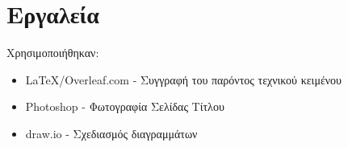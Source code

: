 \documentclass{article}
\begin{document}
\newpage

\section{Εργαλεία}
Χρησιμοποιήθηκαν:
\begin{itemize}
    \item \LaTeX/Overleaf.com - Συγγραφή του παρόντος τεχνικού κειμένου
    \item Photoshop - Φωτογραφία Σελίδας Τίτλου
    \item draw.io - Σχεδιασμός διαγραμμάτων
\end{itemize}
\end{document}
